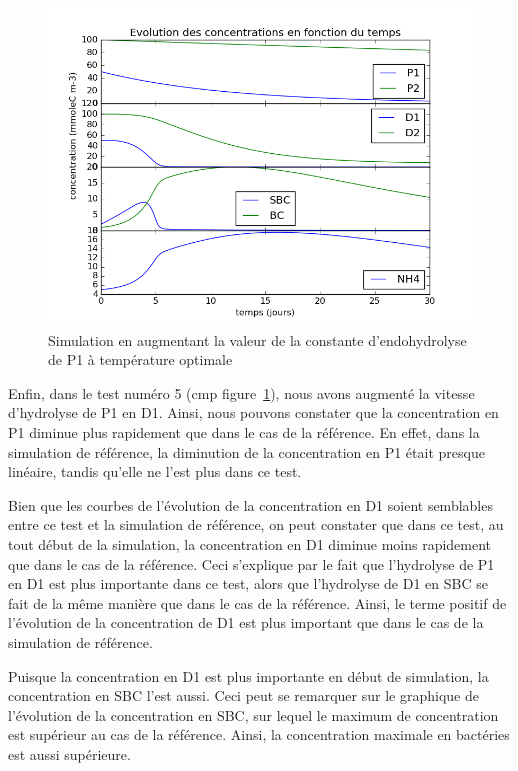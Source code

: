 \begin{figure}[h!]
  \includegraphics[width=\textwidth]{partie2/Test5.png}
  \caption{Simulation en augmentant la valeur de la constante d'endohydrolyse de P1 \`a temp\'erature optimale
  }
  \label{fig:partie2test5}
\end{figure}

\par{
Enfin, dans le test numéro 5 (cmp figure~\ref{fig:partie2test5}),
nous avons augment\'e la vitesse d'hydrolyse de P1 en D1. Ainsi, nous pouvons constater que la concentration en P1 diminue plus rapidement que dans le cas de la r\'ef\'erence. En effet, dans la simulation de r\'ef\'erence, la diminution de la concentration en P1 \'etait presque lin\'eaire, tandis qu'elle ne l'est plus dans ce test.
}
\par{
Bien que les courbes de l'\'evolution de la concentration en D1 soient semblables entre ce test et la simulation de r\'ef\'erence, on peut constater que dans ce test, au tout d\'ebut de la simulation, la concentration en D1 diminue moins rapidement que dans le cas de la r\'ef\'erence. Ceci s'explique par le fait que l'hydrolyse de P1 en D1 est plus importante dans ce test, alors que l'hydrolyse de D1 en SBC se fait de la m\^eme mani\`ere que dans le cas de la r\'ef\'erence. Ainsi, le terme positif de l'\'evolution de la concentration de D1 est plus important que dans le cas de la simulation de r\'ef\'erence.
}
\par{
Puisque la concentration en D1 est plus importante en d\'ebut de simulation, la concentration en SBC l'est aussi. Ceci peut se remarquer sur le graphique de l'\'evolution de la concentration en SBC, sur lequel le maximum de concentration est sup\'erieur au cas de la r\'ef\'erence. Ainsi, la concentration maximale en bact\'eries est aussi sup\'erieure.
}
 
